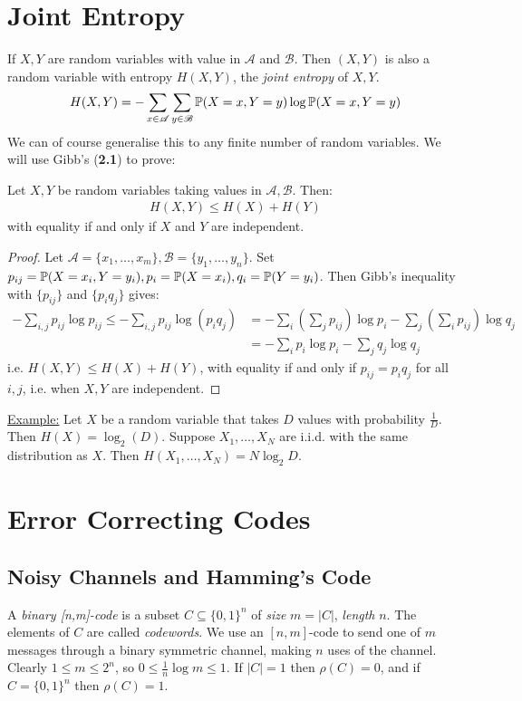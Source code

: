 \documentclass[10pt,a4paper]{article}
\begin{document}
\section{Joint Entropy}
If $X,Y$ are random variables with value in $\mathscr{A}$ and $\mathscr{B}$. Then $(X,Y)$ is also a random variable with entropy $H(X,Y)$, the \emph{joint entropy} of $X,Y$.
\begin{align*}
H(X,Y) = -\sum_{x \in \mathscr{A}} \sum_{y \in \mathscr{B}} \P(X=x, Y=y)\log \P(X=x, Y=y)
\end{align*}
We can of course generalise this to any finite number of random variables. We will use Gibb's (\textbf{2.1}) to prove:
\begin{lemma}
Let $X,Y$ be random variables taking values in $\mathscr{A}, \mathscr{B}$. Then:\begin{align*}
H(X,Y) \leq H(X) + H(Y)
\end{align*}
with equality if and only if $X$ and $Y$ are independent.
\end{lemma}
\begin{proof}
Let $\mathscr{A} = \{x_1, \ldots, x_m\}, \mathscr{B} = \{y_1, \ldots, y_n\}$. Set $p_{ij} = \P(X=x_i, Y=y_i), p_i = \P(X=x_i), q_i = \P(Y=y_i)$. Then Gibb's inequality with $\{p_{ij}\}$ and $\{p_iq_j\}$ gives:
\begin{align*}
-\sum_{i,j} p_{ij}\log p_{ij} \leq -\sum_{i,j} p_{ij}\log(p_iq_j) &= -\sum_i\left(\sum_j p_{ij}\right) \log p_i - \sum_j \left(\sum_i p_{ij}\right) \log q_j\\
&= -\sum_i p_i \log p_i -\sum_j q_j \log q_j
\end{align*}
i.e. $H(X,Y) \leq H(X) + H(Y)$, with equality if and only if $p_{ij} = p_i q_j$ for all $i, j$, i.e. when $X,Y$ are independent.
\end{proof}

\hspace*{-1em}\underline{Example:} Let $X$ be a random variable that takes $D$ values with probability $\frac1D$. Then $H(X) = \log_2(D)$. Suppose $X_1, \ldots, X_N$ are i.i.d. with the same distribution as $X$. Then $H(X_1, \ldots, X_N) = N \log_2 D$.

\section{Error Correcting Codes}
\subsection{Noisy Channels and Hamming's Code}
A \emph{binary [n,m]-code} is a subset $C \subseteq \{0,1\}^n$ of \emph{size} $m = |C|$, \emph{length} $n$. The elements of $C$ are called \emph{codewords}. We use an $[n,m]$-code to send one of $m$ messages through a binary symmetric channel, making $n$ uses of the channel. Clearly $1 \leq m \leq 2^n$, so $0\leq \frac{1}{n}\log m \leq 1$. If $|C| = 1$ then $\rho(C) = 0$, and if $C= \{0,1\}^n$ then $\rho(C) = 1$.
\end{document}
